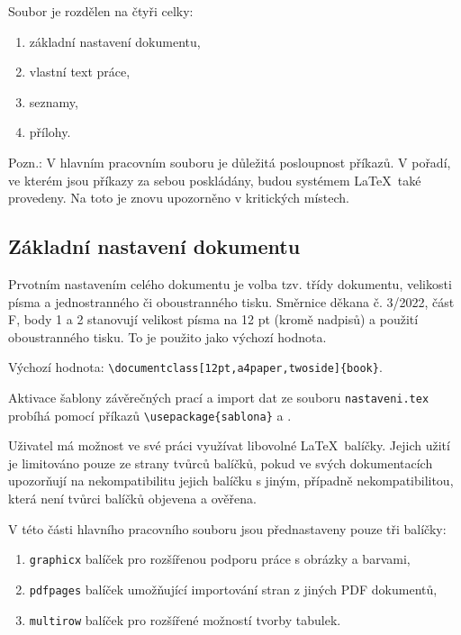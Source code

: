 Soubor je rozdělen na čtyři celky:

\begin{enumerate}
	\item základní nastavení dokumentu,
	\item vlastní text práce,
	\item seznamy,
	\item přílohy.
\end{enumerate}

Pozn.: V hlavním pracovním souboru je důležitá posloupnost příkazů. V pořadí, ve kterém jsou příkazy za sebou poskládány, budou systémem \LaTeX\ také provedeny. Na toto je znovu upozorněno v kritických místech.



\subsection{Základní nastavení dokumentu}
Prvotním nastavením celého dokumentu je volba tzv. třídy dokumentu, velikosti písma a jednostranného či oboustranného tisku. Směrnice děkana č. 3/2022, část F, body 1 a 2 stanovují velikost písma na 12 pt (kromě nadpisů) a použití oboustranného tisku. To je použito jako výchozí hodnota.

Výchozí hodnota: \verb|\documentclass[12pt,a4paper,twoside]{book}|.

Aktivace šablony závěrečných prací a import dat ze souboru \verb|nastaveni.tex| probíhá pomocí příkazů \verb|\usepackage{sablona}| a \verb||.

Uživatel má možnost ve své práci využívat libovolné \LaTeX\ balíčky. Jejich užití je limitováno pouze ze strany tvůrců balíčků, pokud ve svých dokumentacích upozorňují na nekompatibilitu jejich balíčku s jiným, případně nekompatibilitou, která není tvůrci balíčků objevena a ověřena.

V této části hlavního pracovního souboru jsou přednastaveny pouze tři balíčky:

\begin{enumerate}
	\item \verb|graphicx| balíček pro rozšířenou podporu práce s obrázky a barvami,
	\item \verb|pdfpages| balíček umožňující importování stran z jiných PDF dokumentů,
	\item \verb|multirow| balíček pro rozšířené možností tvorby tabulek.
\end{enumerate}



